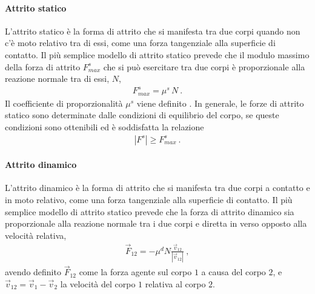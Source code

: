 \documentclass[letterpaper,10pt,italian]{jupyterBook}
\begin{document}
\paragraph{Attrito statico}
\label{\detokenize{ch/mechanics/actions-examples:attrito-statico}}\label{\detokenize{ch/mechanics/actions-examples:physics-hs-mechanics-actions-contact-friction-static}}
\sphinxAtStartPar
L’attrito statico è la forma di attrito che si manifesta tra due corpi quando non c’è moto relativo tra di essi, come una forza tangenziale alla superficie di contatto. Il più semplice modello di attrito statico prevede che il modulo massimo della forza di attrito \(F^s_{max}\) che si può esercitare tra due corpi è proporzionale alla reazione normale tra di essi, \(N\),
\begin{equation*}
\begin{split}F^s_{max} = \mu^s \, N \ .\end{split}
\end{equation*}
\sphinxAtStartPar
Il coefficiente di proporzionalità \(\mu^s\) viene definito . In generale, le forze di attrito statico sono determinate dalle condizioni di equilibrio del corpo, se queste condizioni sono ottenibili ed  è soddisfatta la relazione
\begin{equation*}
\begin{split}|F^s| \ge F^s_{max} \ .\end{split}
\end{equation*}

\paragraph{Attrito dinamico}
\label{\detokenize{ch/mechanics/actions-examples:attrito-dinamico}}\label{\detokenize{ch/mechanics/actions-examples:physics-hs-mechanics-actions-contact-friction-dynamic}}
\sphinxAtStartPar
L’attrito dinamico è la forma di attrito che si manifesta tra due corpi a contatto e in moto relativo, come una forza tangenziale alla superficie di contatto. Il più semplice modello di attrito statico prevede che la forza di attrito dinamico sia proporzionale alla reazione normale tra i due corpi e diretta in verso opposto alla velocità relativa,
\begin{equation*}
\begin{split}\vec{F}_{12} = - \mu^d N \frac{\vec{v}_{12}}{|\vec{v}_{12}|} \ ,\end{split}
\end{equation*}
\sphinxAtStartPar
avendo definito \(\vec{F}_{12}\) come la forza agente sul corpo \(1\) a causa del corpo \(2\), e \(\vec{v}_{12} = \vec{v}_1 - \vec{v}_2\) la velocità del corpo \(1\) relativa al corpo \(2\).
\end{document}
